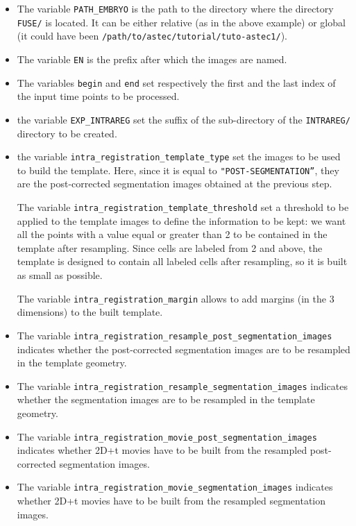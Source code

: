 \begin{itemize}
  \itemsep -1ex
  \item The variable \texttt{PATH\_EMBRYO} is the path to the directory where
    the directory \texttt{FUSE/} is located. It can be either relative (as in the
    above example) or
    global (it could have been \texttt{/path/to/astec/tutorial/tuto-astec1/}).
  \item The variable \texttt{EN} is the prefix after which the  images
    are named. 
  \item The variables \texttt{begin} and \texttt{end} set respectively the
    first and the last index of the input time points to be processed.
  \item  the variable \texttt{EXP\_INTRAREG} set the suffix of the
    sub-directory of the \texttt{INTRAREG/} directory to be created.
  \item  the variable \texttt{intra\_registration\_template\_type} set
    the images to be used to build the template. Here, since it is
    equal to \texttt{"POST-SEGMENTATION''}, they are the
    post-corrected segmentation images obtained at the previous step.

    The variable \texttt{intra\_registration\_template\_threshold} set
    a threshold to be applied to the template images to define the
    information to be kept: we want all the points with a value equal
    or greater than 2 to be contained in the template after
    resampling. Since cells are labeled from 2 and above, the template
    is designed to contain all labeled cells after resampling, so it
    is built as small as possible.

    The variable \texttt{intra\_registration\_margin} allows to add
    margins (in the 3 dimensions) to the built template.
    
  \item The variable
    \texttt{intra\_registration\_resample\_post\_segmentation\_images}
    indicates whether the post-corrected segmentation images are to be resampled in
    the template geometry. 
  \item The variable
    \texttt{intra\_registration\_resample\_segmentation\_images}
    indicates whether the segmentation images are to be resampled in
    the template geometry. 
  \item The variable
    \texttt{intra\_registration\_movie\_post\_segmentation\_images}
    indicates whether 2D+t movies have to be built from the resampled
    post-corrected segmentation images.
  \item The variable
    \texttt{intra\_registration\_movie\_segmentation\_images}
    indicates whether 2D+t movies have to be built from the resampled
    segmentation images.
\end{itemize}

